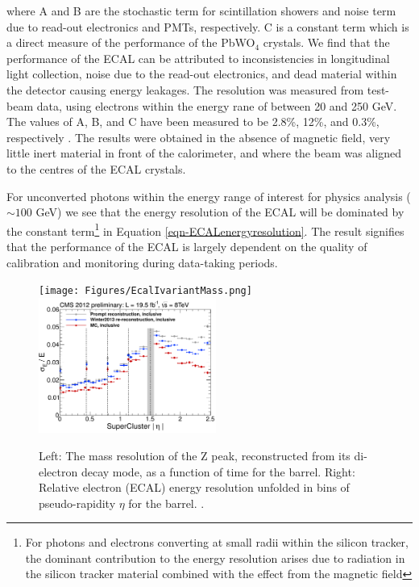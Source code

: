 where A and B are the stochastic term for scintillation showers and noise term due to read-out electronics and PMTs, respectively. C is a constant term which is a direct measure of the performance of the PbWO$_4$ crystals. We find that the performance of the ECAL can be attributed to inconsistencies in longitudinal light collection, noise due to the read-out electronics, and dead material within the detector causing energy leakages. The resolution was measured from test-beam data, using electrons within the energy rane of between 20 and 250 GeV. The values of A, B, and C have been measured to be 2.8\%, 12\%, and 0.3\%, respectively \cite{CMSexperiment}. The results were obtained in the absence of magnetic field, very little inert material in front of the calorimeter, and where the beam was aligned to the centres of the ECAL crystals. 

For unconverted photons within the energy range of interest for physics analysis ($\sim100$ GeV) we see that the energy resolution of the ECAL will be dominated by the constant term\footnote{For photons and electrons converting at small radii within the silicon tracker, the dominant contribution to the energy resolution arises due to radiation in the silicon tracker material combined with the effect from the magnetic field} in Equation \ref{eqn-ECALenergyresolution}. The result signifies that the performance of the ECAL is largely dependent on the quality of calibration and monitoring during data-taking periods. 

\begin{figure} \label{fig-}
\texttt{[image: Figures/EcalIvariantMass.png]}
\includegraphics[width=0.52\textwidth]{Figures/EcalEtaInclusive.png}
\caption{Left: The mass resolution of the Z peak, reconstructed from its di-electron decay mode, as a function of time for the barrel. Right: Relative electron (ECAL) energy resolution unfolded in bins of pseudo-rapidity $\eta$ for the barrel. \cite{ECALPerformance}.}
\end{figure}


